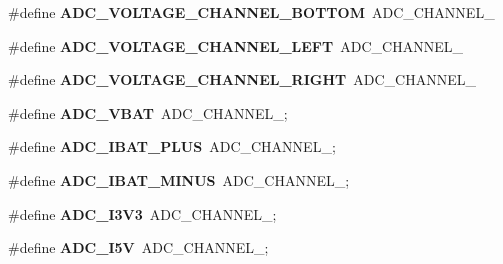 \begin{DoxyCompactItemize}
\item 
\hypertarget{group__eps__configuration_gaf6a83239410e6d06cfd9c73bd8aaac34}{\#define {\bfseries A\-D\-C\-\_\-\-V\-O\-L\-T\-A\-G\-E\-\_\-\-C\-H\-A\-N\-N\-E\-L\-\_\-\-B\-O\-T\-T\-O\-M}~A\-D\-C\-\_\-\-C\-H\-A\-N\-N\-E\-L\-\_}\label{group__eps__configuration_gaf6a83239410e6d06cfd9c73bd8aaac34}

\item 
\hypertarget{group__eps__configuration_gabc3693920da43f4cf5902196307f1646}{\#define {\bfseries A\-D\-C\-\_\-\-V\-O\-L\-T\-A\-G\-E\-\_\-\-C\-H\-A\-N\-N\-E\-L\-\_\-\-L\-E\-F\-T}~A\-D\-C\-\_\-\-C\-H\-A\-N\-N\-E\-L\-\_}\label{group__eps__configuration_gabc3693920da43f4cf5902196307f1646}

\item 
\hypertarget{group__eps__configuration_ga6a96aedf036e488ecaa1cb2e65255eae}{\#define {\bfseries A\-D\-C\-\_\-\-V\-O\-L\-T\-A\-G\-E\-\_\-\-C\-H\-A\-N\-N\-E\-L\-\_\-\-R\-I\-G\-H\-T}~A\-D\-C\-\_\-\-C\-H\-A\-N\-N\-E\-L\-\_}\label{group__eps__configuration_ga6a96aedf036e488ecaa1cb2e65255eae}

\item 
\hypertarget{group__eps__configuration_ga6e750989e6f8a21aa562cae84400cd75}{\#define {\bfseries A\-D\-C\-\_\-\-V\-B\-A\-T}~A\-D\-C\-\_\-\-C\-H\-A\-N\-N\-E\-L\-\_;}\label{group__eps__configuration_ga6e750989e6f8a21aa562cae84400cd75}

\item 
\hypertarget{group__eps__configuration_gaf2e6da531aef67d8c687d8040bf56d29}{\#define {\bfseries A\-D\-C\-\_\-\-I\-B\-A\-T\-\_\-\-P\-L\-U\-S}~A\-D\-C\-\_\-\-C\-H\-A\-N\-N\-E\-L\-\_;}\label{group__eps__configuration_gaf2e6da531aef67d8c687d8040bf56d29}

\item 
\hypertarget{group__eps__configuration_gac37c20021df51909a2039b5d9815c096}{\#define {\bfseries A\-D\-C\-\_\-\-I\-B\-A\-T\-\_\-\-M\-I\-N\-U\-S}~A\-D\-C\-\_\-\-C\-H\-A\-N\-N\-E\-L\-\_;}\label{group__eps__configuration_gac37c20021df51909a2039b5d9815c096}

\item 
\hypertarget{group__eps__configuration_ga47eaaf28b8299b92065ef21dc239044c}{\#define {\bfseries A\-D\-C\-\_\-\-I3\-V3}~A\-D\-C\-\_\-\-C\-H\-A\-N\-N\-E\-L\-\_;}\label{group__eps__configuration_ga47eaaf28b8299b92065ef21dc239044c}

\item 
\hypertarget{group__eps__configuration_ga5dd2743f585f8898aad9301c5c278c39}{\#define {\bfseries A\-D\-C\-\_\-\-I5\-V}~A\-D\-C\-\_\-\-C\-H\-A\-N\-N\-E\-L\-\_;}\label{group__eps__configuration_ga5dd2743f585f8898aad9301c5c278c39}

\end{DoxyCompactItemize}
